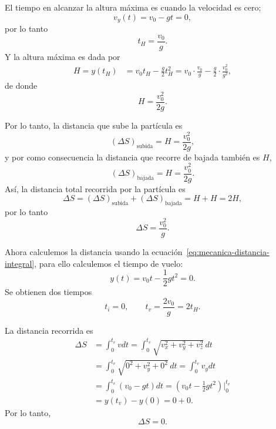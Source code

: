 \documentclass[../apunte_mecanica_clasica.tex]{subfiles}%
\begin{document}
El tiempo en alcanzar la altura máxima es cuando la velocidad es cero;
\begin{equation*}
    v_y(t)=v_0-gt=0,
\end{equation*}
por lo tanto
\begin{equation}
    t_H=\frac{v_0}{g}.
    \label{eq:mecanica-tiempo-altura-maxima-vertical}
\end{equation}
Y la altura máxima es dada por
\begin{align}
    H=y(t_H)&=v_0t_H-\frac{g}{2}t_H^2
    =v_0\cdot\frac{v_0}{g}-\frac{g}{2}\cdot\frac{v_0^2}{g^2},
\end{align}
de donde
\begin{equation}
    H=\frac{v_0^2}{2g}.
    \label{eq:mecanica-altura-maxima-vertical}
\end{equation}

Por lo tanto, la distancia que sube la partícula es
\begin{equation}
    (\Delta S)_{\text{subida}}=H=\frac{v_0^2}{2g},
    \label{eq:mecanica-distancia-subida-vertical}
\end{equation}
y por como consecuencia la distancia que recorre de bajada también es $H$,
\begin{equation}
    (\Delta S)_{\text{bajada}}=H=\frac{v_0^2}{2g}.
    \label{eq:mecanica-distancia-bajada-vertical}
\end{equation}
Así, la distancia total recorrida por la partícula es
\begin{equation*}
    \Delta S=(\Delta S)_{\text{subida}}+(\Delta S)_{\text{bajada}}=H+H=2H,
\end{equation*}
por lo tanto
\begin{equation}
    \Delta S=\frac{v_0^2}{g}.
    \label{eq:mecanica-distancia-total-vertical}
\end{equation}

Ahora calculemos la distancia usando la ecuación~\eqref{eq:mecanica-distancia-integral}, para ello calculemos el tiempo de vuelo:
\begin{equation*}
    y(t)=v_0t-\frac{1}{2}gt^2=0.
\end{equation*}
Se obtienen dos tiempos
\begin{equation}
    t_i=0,
    \qquad
    t_v=\frac{2v_0}{g}=2t_H.
    \label{eq:mecanica-tiempo-vuelo-vertical}
\end{equation}

La distancia recorrida es
\begin{align}
    \Delta S
    &=\int_{0}^{t_v}vdt
      =\int_{0}^{t_v}\sqrt{v_x^2+v_y^2+v_z^2}\,dt \\
    &=\int_{0}^{t_v}\sqrt{0^2+v_y^2+0^2}\,dt
      =\int_{0}^{t_v}v_y dt \\
    &=\int_{0}^{t_v}(v_0-gt)dt
      =\left(v_0t-\frac{1}{2}gt^2\right)\Big|_{0}^{t_v} \\
    &=y(t_v)-y(0)=0+0.
\end{align}
Por lo tanto,
\begin{equation}
    \Delta S=0.
    \label{eq:mecanica-distancia-cancelacion-vertical}
\end{equation}
\end{document}
